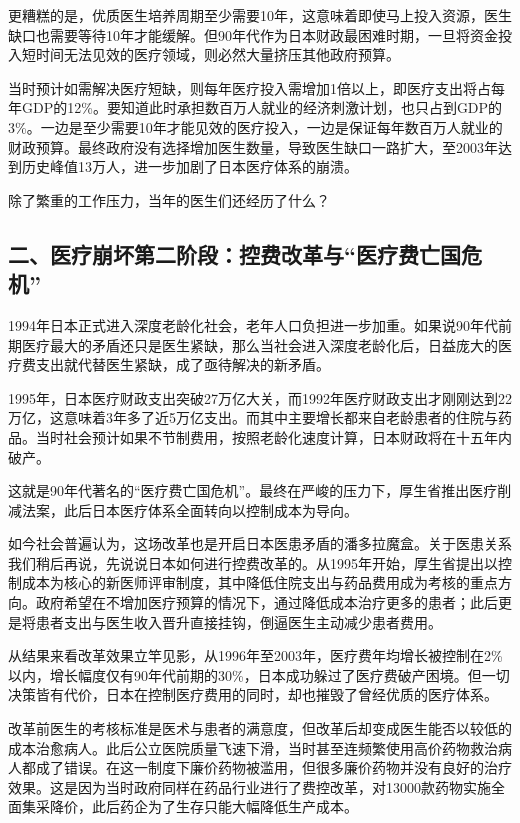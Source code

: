 更糟糕的是，优质医生培养周期至少需要10年，这意味着即使马上投入资源，医生缺口也需要等待10年才能缓解。但90年代作为日本财政最困难时期，一旦将资金投入短时间无法见效的医疗领域，则必然大量挤压其他政府预算。

当时预计如需解决医疗短缺，则每年医疗投入需增加1倍以上，即医疗支出将占每年GDP的12\%。要知道此时承担数百万人就业的经济刺激计划，也只占到GDP的3\%。一边是至少需要10年才能见效的医疗投入，一边是保证每年数百万人就业的财政预算。最终政府没有选择增加医生数量，导致医生缺口一路扩大，至2003年达到历史峰值13万人，进一步加剧了日本医疗体系的崩溃。

除了繁重的工作压力，当年的医生们还经历了什么？

\subsection{二、医疗崩坏第二阶段：控费改革与“医疗费亡国危机”}

1994年日本正式进入深度老龄化社会，老年人口负担进一步加重。如果说90年代前期医疗最大的矛盾还只是医生紧缺，那么当社会进入深度老龄化后，日益庞大的医疗费支出就代替医生紧缺，成了亟待解决的新矛盾。

1995年，日本医疗财政支出突破27万亿大关，而1992年医疗财政支出才刚刚达到22万亿，这意味着3年多了近5万亿支出。而其中主要增长都来自老龄患者的住院与药品。当时社会预计如果不节制费用，按照老龄化速度计算，日本财政将在十五年内破产。

这就是90年代著名的“医疗费亡国危机”。最终在严峻的压力下，厚生省推出医疗削减法案，此后日本医疗体系全面转向以控制成本为导向。

如今社会普遍认为，这场改革也是开启日本医患矛盾的潘多拉魔盒。关于医患关系我们稍后再说，先说说日本如何进行控费改革的。从1995年开始，厚生省提出以控制成本为核心的新医师评审制度，其中降低住院支出与药品费用成为考核的重点方向。政府希望在不增加医疗预算的情况下，通过降低成本治疗更多的患者；此后更是将患者支出与医生收入晋升直接挂钩，倒逼医生主动减少患者费用。

从结果来看改革效果立竿见影，从1996年至2003年，医疗费年均增长被控制在2\%以内，增长幅度仅有90年代前期的30\%，日本成功躲过了医疗费破产困境。但一切决策皆有代价，日本在控制医疗费用的同时，却也摧毁了曾经优质的医疗体系。

改革前医生的考核标准是医术与患者的满意度，但改革后却变成医生能否以较低的成本治愈病人。此后公立医院质量飞速下滑，当时甚至连频繁使用高价药物救治病人都成了错误。在这一制度下廉价药物被滥用，但很多廉价药物并没有良好的治疗效果。这是因为当时政府同样在药品行业进行了费控改革，对13000款药物实施全面集采降价，此后药企为了生存只能大幅降低生产成本。

